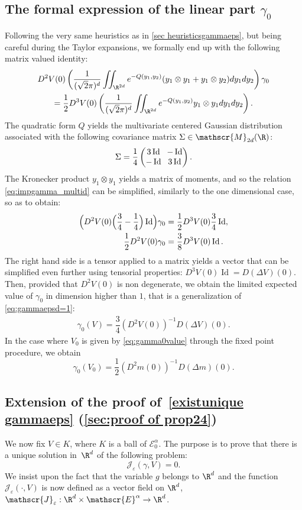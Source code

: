 \documentclass[10pt]{amsart}
\let\mathcal\mathscr
\newcommand{\cM}{\mathcal{M}}
\theoremstyle{plain}
\theoremstyle{definition}
\newcommand{\Je}{\mathcal{J}_\eps}
\let\eps\varepsilon
\let\ds\displaystyle
\newcommand{\Ea}{\mathcal{E}^\alpha}
\newcommand{\Eaz}{\mathcal{E}^\alpha_0}
\DeclareMathOperator{\Id}{Id}
\begin{document}
\subsection{The formal expression of the linear part $\gamma_0$}
Following the very same heuristics as in \cref{sec heuristicsgammaeps}, but being careful during the Taylor expansions, we formally end up with the following matrix valued identity:
\begin{multline}\label{eq:impgamma_multid}
D^2 V(0) \left(\dfrac{1}{(\sqrt{2}\pi)^d} \ds \iint_{\R^{2d}} e^{ -Q(y_1,y_2)} (y_1 \otimes y_1 + y_1 \otimes y_2) dy_1 dy_2 \right) \gamma_0 \\
=\dfrac{1}{2} D^3 V(0) \left (\dfrac{1}{(\sqrt{2}\pi)^d} \iint_{\R^{2d}} e^{ -Q(y_1,y_2) } y_1 \otimes y_1 dy_1 dy_2 \right).
\end{multline}
The quadratic form $Q$ yields the multivariate centered Gaussian distribution associated with the following covariance matrix $\Sigma \in \cM_{2d}(\R) $:
\[\arraycolsep3.5pt
\Sigma = \dfrac{1}{4} \begin{pmatrix}
3 \Id & - \Id \\
- \Id & 3 \Id
\end{pmatrix}.
\]
The Kronecker product $y_1 \otimes y_1 $ yields a matrix of moments, and so the relation \eqref{eq:impgamma_multid} can be simplified, similarly to the one dimensional case, so as to obtain:
\begin{align*}
\Bigl (D^2V(0) \Bigl(\dfrac{3}{4}-\dfrac{1}{4}\Bigr) \Id\Bigr) \gamma_0 &= \frac12 D^3V(0) \dfrac{3}{4} \Id, \\
\frac12 D^2V(0)\gamma_0 & = \frac38 D^3V(0) \Id.
\end{align*}
The right hand side is a tensor applied to a matrix yields a vector that can be simplified even further using tensorial properties:
$D^3 V(0) \Id = D (\Delta V)(0)$.
Then, provided that $D^2V(0)$ is non degenerate, we obtain the limited expected value of $\gamma_0$ in dimension higher than $1$, that is a generalization of \eqref{eq:gammaepsd=1}:
\begin{align*}
\gamma_0(V) = \dfrac{3}{4} \left (D^2 V(0)\right)^{-1} D (\Delta V)(0).
\end{align*}
In the case where $V_0$ is given by \eqref{eq:gamma0value} through the fixed point procedure, we obtain
\begin{equation*}
\gamma_0(V_0) = \dfrac{1}{2} \left (D^2 m(0)\right)^{-1} D (\Delta m)(0).
\end{equation*}

\subsection{Extension of the proof of~\cref{existunique gammaeps} (\cref{sec:proof of prop24})}
We now fix $V \in K$, where $K$ is a ball of $\Eaz$. The purpose is to prove that there is a unique solution in~$\R^d$ of the following problem:
\begin{equation}\label{eq:Je_0}
\Je(\gamma,V) = 0.
\end{equation}
We insist upon the fact that the variable $g$ belongs to $\R^d$ and the function $\Je(\cdot,V)$ is now defined as a vector field on $\R^d$, $\Je: \R^d \times \Ea \to \R^d$.
\end{document}
